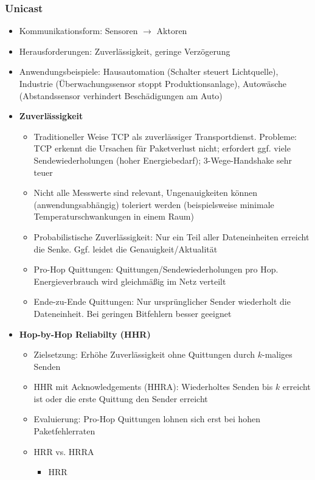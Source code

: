 \subsubsection{Unicast}
\begin{itemize}
	\item Kommunikationsform: Sensoren \(\rightarrow\) Aktoren
	\item Herausforderungen: Zuverlässigkeit, geringe Verzögerung
	\item Anwendungsbeispiele: Hausautomation (Schalter steuert Lichtquelle), Industrie (Überwachungssensor stoppt Produktionsanlage), Autowäsche (Abstandssensor verhindert Beschädigungen am Auto)
	\item \textbf{Zuverlässigkeit}
	\begin{itemize}
		\item Traditioneller Weise TCP als zuverlässiger Transportdienst. Probleme: TCP erkennt die Ursachen für Paketverlust nicht; erfordert ggf. viele Sendewiederholungen (hoher Energiebedarf); 3-Wege-Handshake sehr teuer
		\item Nicht alle Messwerte sind relevant, Ungenauigkeiten können (anwendungsabhängig) toleriert werden (beispielsweise minimale Temperaturschwankungen in einem Raum)
		\item Probabilistische Zuverlässigkeit: Nur ein Teil aller Dateneinheiten erreicht die Senke. Ggf. leidet die Genauigkeit/Aktualität
		\item Pro-Hop Quittungen: Quittungen/Sendewiederholungen pro Hop. Energieverbrauch wird gleichmäßig im Netz verteilt
		\item Ende-zu-Ende Quittungen: Nur ursprünglicher Sender wiederholt die Dateneinheit. Bei geringen Bitfehlern besser geeignet
	\end{itemize}
	\item \textbf{Hop-by-Hop Reliabilty (HHR)}
	\begin{itemize}
		\item Zielsetzung: Erhöhe Zuverlässigkeit ohne Quittungen durch \(k\)-maliges Senden
		\item HHR mit Acknowledgements (HHRA): Wiederholtes Senden bis \(k\) erreicht ist oder die erste Quittung den Sender erreicht
		\item Evaluierung: Pro-Hop Quittungen lohnen sich erst bei hohen Paketfehlerraten
		\item HRR vs. HRRA
		\begin{itemize}
			\item HRR
			\begin{itemize}

\end{itemize}
\end{itemize}
\end{itemize}
\end{itemize}
